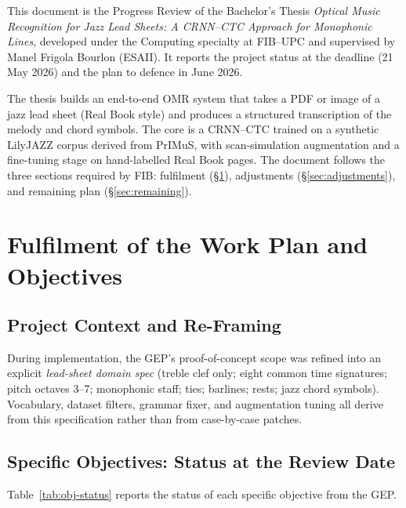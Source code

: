 \documentclass[11pt, a4paper]{article}
\begin{document}
This document is the Progress Review of the Bachelor's Thesis \textit{Optical Music Recognition for Jazz Lead Sheets: A CRNN--CTC Approach for Monophonic Lines}, developed under the Computing specialty at FIB--UPC and supervised by Manel Frigola Bourlon (ESAII). It reports the project status at the deadline (21 May 2026) and the plan to defence in June 2026.

The thesis builds an end-to-end OMR system that takes a PDF or image of a jazz lead sheet (Real Book style) and produces a structured transcription of the melody and chord symbols. The core is a CRNN--CTC trained on a synthetic LilyJAZZ corpus derived from PrIMuS, with scan-simulation augmentation and a fine-tuning stage on hand-labelled Real Book pages. The document follows the three sections required by FIB: fulfilment (\S\ref{sec:fulfilment}), adjustments (\S\ref{sec:adjustments}), and remaining plan (\S\ref{sec:remaining}).

\section{Fulfilment of the Work Plan and Objectives}
\label{sec:fulfilment}

\subsection{Project Context and Re-Framing}
During implementation, the GEP's proof-of-concept scope was refined into an explicit \textit{lead-sheet domain spec} (treble clef only; eight common time signatures; pitch octaves 3--7; monophonic staff; ties; barlines; rests; jazz chord symbols). Vocabulary, dataset filters, grammar fixer, and augmentation tuning all derive from this specification rather than from case-by-case patches.

\subsection{Specific Objectives: Status at the Review Date}
Table~\ref{tab:obj-status} reports the status of each specific objective from the GEP.
\end{document}
